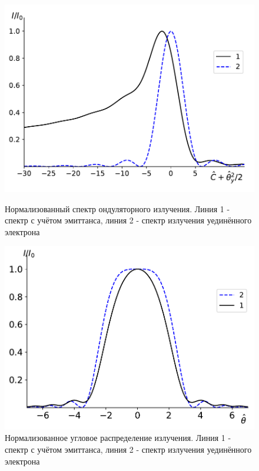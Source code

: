 \begin{figure}
	\centering  
	\begin{minipage}{0.49\textwidth}
		\centering
		\includegraphics[width=\textwidth]{pic/spec_integ_emittance.pdf}
		\caption{Нормализованный спектр ондуляторного излучения. Линия 1 - спектр с учётом эмиттанса, линия 2 - спектр излучения уединённого электрона}
		\label{fig:2spec_emittance_and_single}
	\end{minipage}\hfill
	\begin{minipage}{0.49\textwidth}
		\centering
		\includegraphics[width=\textwidth]{pic/angle_integ_emittance.pdf}
		\caption{Нормализованное угловое распределение излучения. Линия 1 - спектр с учётом эмиттанса, линия 2 - спектр излучения уединённого электрона}
		\label{fig:spec}
	\end{minipage}    
\end{figure}

